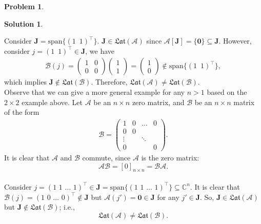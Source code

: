 \documentclass{article}
\theoremstyle{definition}
\newtheorem*{prob*}{Problem}
\newtheorem*{sln*}{Solution}
\newcommand{\xpan}{\text{span}}
\newcommand{\J}{\mathbf{J}}
\begin{document}
\begin{prob*}
\begin{sln*}
\begin{enumerate}
			Consider $\J = \xpan\{(1\,\,\,1)^\top\}$. $\J \in \mathfrak{Lat}(\mathcal{A})$ since $\mathcal{A}[\J] = \{ \mathbf{0}\} \subseteq \J$. However, consider $j = (1\,\,\,1)^\top \in \J$, we have
			\begin{align*}
			\mathcal{B}(j) = \begin{pmatrix}
			1&0\\
			0&0
			\end{pmatrix}\begin{pmatrix}
			1\\1
			\end{pmatrix}=
			\begin{pmatrix}
			1\\0
			\end{pmatrix} \notin \xpan\{ (1\,\,\, 1)^\top \},
			\end{align*} 
			which implies $\J \notin \mathfrak{Lat}(\mathcal{B})$. Therefore, $\mathfrak{Lat}(\mathcal{A}) \neq \mathfrak{Lat}(\mathcal{B})$.\\
			
			Observe that we can give a more general example for any $n>1$ based on the $2\times 2$ example above. Let $\mathcal{A}$ be an $n\times n$ zero matrix, and $\mathcal{B}$ be an $n\times n$ matrix of the form
			\begin{align*}
			\mathcal{B} = \begin{pmatrix}
			1&0&\dots&0\\
			0&0\\
			\vdots&&\ddots\\
			0&&&0
			\end{pmatrix}.
			\end{align*}
			It is clear that $\mathcal{A}$ and $\mathcal{B}$ commute, since $\mathcal{A}$ is the zero matrix: $$\mathcal{AB} = [0]_{n\times n} = \mathcal{BA}.$$\\
		
			Consider $j = (1\,\,1\,\,\dots\,\,1)^\top \in \J = \xpan\{ (1\,\,1\,\,\dots\,\,1)^\top \} \subseteq \mathbb{C}^n$. It is clear that $\mathcal{B}(j) = (1\,\,0\,\,\dots\,\,0)^\top \notin \J$ but $\mathcal{A}(j') = \mathbf{0} \in \J$ for any $j'\in\J$. So, $\J \in \mathfrak{Lat}(\mathcal{A})$ but $\J \notin \mathfrak{Lat}(\mathcal{B})$; i.e., $$\mathfrak{Lat}(\mathcal{A}) \neq \mathfrak{Lat}(\mathcal{B}).$$ 
		\end{enumerate}
	\end{sln*}
\end{prob*}
\end{document}

